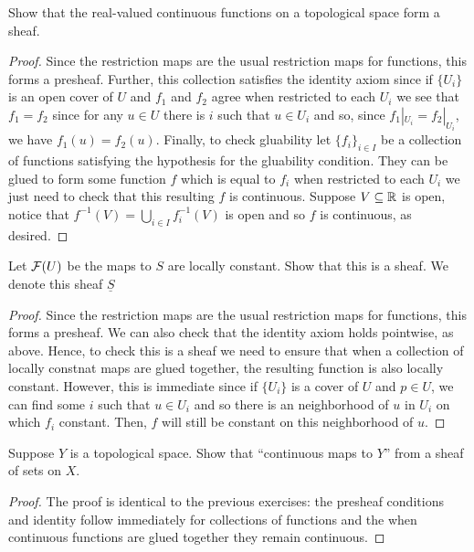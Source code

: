 \begin{exercise}
    Show that the real-valued continuous functions on a topological space form a sheaf. 
\end{exercise}

\begin{proof}
    Since the restriction maps are the usual restriction maps for functions, this forms a presheaf. Further, this collection satisfies the identity axiom since if $\{U_i\}$ is an open cover of $U$ and $f_1$ and $f_2$ agree when restricted to each $U_i$ we see that $f_1 = f_2$ since for any $u \in U$ there is $i$ such that $u \in U_i$ and so, since $f_1|_{U_i} = f_2|_{U_i}$, we have $f_1(u) = f_2(u)$. Finally, to check gluability let $\{f_i\}_{i \in I}$ be a collection of functions satisfying the hypothesis for the gluability condition. They can be glued to form some function $f$ which is equal to $f_i$ when restricted to each $U_i$ we just need to check that this resulting $f$ is continuous. Suppose $V \subseteq \mathbb{R}$ is open, notice that $f^{-1}(V) = \bigcup_{i \in I} f_i^{-1}(V)$ is open and so $f$ is continuous, as desired. 
\end{proof}

\begin{exercise}
    Let $\mathcal{F}(U)$ be the maps to $S$ are locally constant. Show that this is a sheaf. We denote this sheaf $\underline{S}$
\end{exercise}

\begin{proof}
    Since the restriction maps are the usual restriction maps for functions, this forms a presheaf. We can also check that the identity axiom holds pointwise, as above. Hence, to check this is a sheaf we need to ensure that when a collection of locally constnat maps are glued together, the resulting function is also locally constant. However, this is immediate since if $\{U_i\}$ is a cover of $U$ and $p \in U$, we can find some $i$ such that $u \in U_i$ and so there is an neighborhood of $u$ in $U_i$ on which $f_i$ constant. Then, $f$ will still be constant on this neighborhood of $u$.  
\end{proof}

\begin{exercise}
    Suppose $Y$ is a topological space. Show that ``continuous maps to $Y$'' from a sheaf of sets on $X$. 
\end{exercise}

\begin{proof}
    The proof is identical to the previous exercises: the presheaf conditions and identity follow immediately for collections of functions and the when continuous functions are glued together they remain continuous. 
\end{proof}

